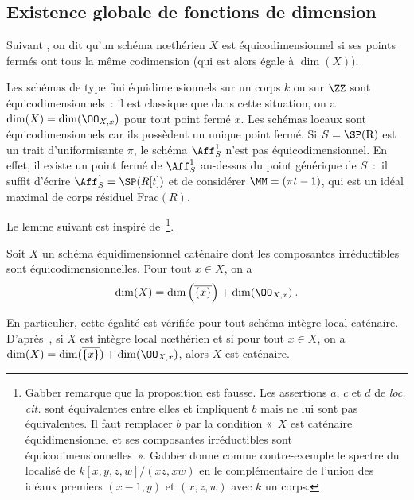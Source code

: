 \documentclass[10pt]{../fichiers-configuration-latex/smfart}
\begin{document}
\subsection{Existence globale de fonctions de dimension}


Suivant , on dit qu'un schéma nœthérien $X$ est équicodimensionnel si ses points
fermés ont tous la même codimension (qui est alors égale à $\dim(X)$).

\begin{exemple2} Les schémas de type fini équidimensionnels sur un corps $k$ ou sur $\ZZ$ sont
équicodimensionnels~: il est classique que dans cette situation, on a $\dim(X) = \dim(\OO_{X,x})$
pour tout point fermé $x$.  Les schémas locaux sont équicodimensionnels car ils possèdent un unique
point fermé.  Si $S=\mathrm{\SP(R)}$ est un trait d'uniformisante $\pi$, le schéma $\Aff^1_S$ n'est
pas équicodimensionnel. En effet, il existe un point fermé de $\Aff^1_S$ au-dessus du point
générique de $S$~:~il suffit d'écrire $\Aff^1_S=\SP(R[t])$ et de considérer $\MM=(\pi t -1 )$, qui
est un idéal maximal de corps résiduel $\mathrm{Frac}(R)$.  \end{exemple2}

Le lemme suivant est inspiré de~\;\footnote{Gabber remarque que la proposition
 est fausse. Les assertions $a$, $c$ et $d$ de \emph{loc. cit.} sont
équivalentes entre elles et impliquent $b$ mais ne lui sont pas équivalentes. Il faut remplacer $b$
par la condition « $X$ est caténaire équidimensionnel et ses composantes irréductibles sont
équicodimensionnelles ». Gabber donne comme contre-exemple le spectre du localisé de
$k[x,y,z,w]/(xz,xw)$ en le complémentaire de l'union des idéaux premiers $(x-1,y)$ et $(x,z,w)$ avec
$k$ un corps.}.

\begin{lemme2} \label{14-lemme-EGA-faux} Soit $X$ un schéma équidimensionnel caténaire dont les
composantes irréductibles sont équicodimensionnelles. Pour tout $x\in X$, on a $$\dim(X) =
\dim\left(\overline{\{x\}}\right)+\dim(\OO_{X,x})\: .$$ \end{lemme2}

\begin{remarque2} En particulier, cette égalité est vérifiée pour tout schéma intègre local
caténaire. D'après~\cite[th.~31.4]{CRT@Matsumura}, si $X$ est intègre local nœthérien et si pour
tout $x\in X$, on a  $\dim(X)=\dim(\overline{\{x\}} )+\dim(\OO_{X,x})$, alors $X$ est caténaire.
\end{remarque2}
\end{document}
